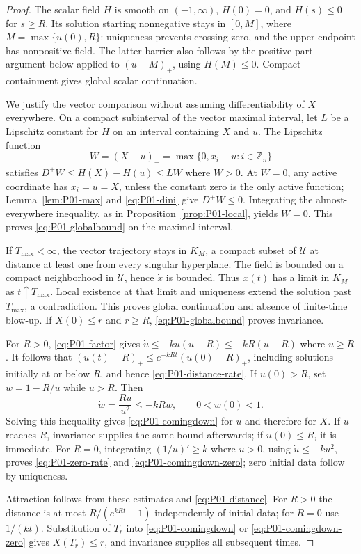 \documentclass[11pt]{article}
\newcommand{\Zn}{\mathbb{Z}_n}
\newcommand{\Domain}{\mathcal{U}}
\theoremstyle{definition}
\theoremstyle{remark}
\begin{document}
\begin{proof}
The scalar field $H$ is smooth on $(-1,\infty)$, $H(0)=0$, and
$H(s)\le0$ for $s\ge R$. Its solution starting nonnegative stays in
$[0,M]$, where $M=\max\{u(0),R\}$: uniqueness prevents crossing zero,
and the upper endpoint has nonpositive field. The latter barrier also
follows by the positive-part argument below applied to $(u-M)_+$,
using $H(M)\le0$. Compact containment gives global scalar continuation.

We justify the vector comparison without assuming differentiability of
$X$ everywhere. On a compact subinterval of the vector maximal interval,
let $L$ be a Lipschitz constant for $H$ on an interval containing $X$
and $u$. The Lipschitz function
\[
 W=(X-u)_+=\max\{0,x_i-u:i\in\Zn\}
\]
satisfies $D^+W\le H(X)-H(u)\le LW$ where $W>0$.
At $W=0$, any active coordinate has $x_i=u=X$, unless the constant
zero is the only active function; Lemma~\ref{lem:P01-max} and
\eqref{eq:P01-dini} give $D^+W\le0$. Integrating the almost-everywhere
inequality, as in Proposition~\ref{prop:P01-local}, yields $W=0$.
This proves \eqref{eq:P01-globalbound} on the maximal interval.

If $T_{\max}<\infty$, the vector trajectory stays in $K_M$, a compact
subset of $\Domain$ at distance at least one from every singular
hyperplane. The field is bounded on a compact neighborhood in $\Domain$,
hence $\dot x$ is bounded. Thus $x(t)$ has a limit in $K_M$ as
$t\uparrow T_{\max}$. Local existence at that limit and uniqueness
extend the solution past $T_{\max}$, a contradiction. This proves
global continuation and absence of finite-time blow-up. If
$X(0)\le r$ and $r\ge R$, \eqref{eq:P01-globalbound} proves invariance.

For $R>0$, \eqref{eq:P01-factor} gives
$\dot u\le-ku(u-R)\le-kR(u-R)$ where $u\ge R$. It follows that
$(u(t)-R)_+\le e^{-kRt}(u(0)-R)_+$, including solutions initially at
or below $R$, and hence \eqref{eq:P01-distance-rate}. If $u(0)>R$,
set $w=1-R/u$ while $u>R$. Then
\[
 \dot w=\frac{R\dot u}{u^2}\le-kR w,\qquad 0<w(0)<1.
\]
Solving this inequality gives \eqref{eq:P01-comingdown} for $u$ and
therefore for $X$. If $u$ reaches $R$, invariance supplies the same
bound afterwards; if $u(0)\le R$, it is immediate.
For $R=0$, integrating $(1/u)'\ge k$ where $u>0$, using
$\dot u\le-ku^2$, proves \eqref{eq:P01-zero-rate} and
\eqref{eq:P01-comingdown-zero}; zero initial data follow by uniqueness.

Attraction follows from these estimates and \eqref{eq:P01-distance}.
For $R>0$ the distance is at most $R/(e^{kRt}-1)$ independently of
initial data; for $R=0$ use $1/(kt)$. Substitution of $T_r$ into
\eqref{eq:P01-comingdown} or \eqref{eq:P01-comingdown-zero} gives
$X(T_r)\le r$, and invariance supplies all subsequent times.
\end{proof}
\end{document}
